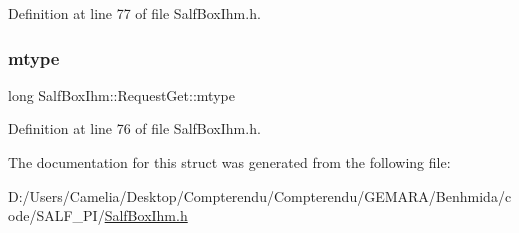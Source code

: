 Definition at line 77 of file Salf\+Box\+Ihm.\+h.

\mbox{\label{struct_salf_box_ihm_1_1_request_get_a4d551291208c5aee03b0e6fb080a0fc5}} 
\subsubsection{\texorpdfstring{mtype}{mtype}}
{\footnotesize\ttfamily long Salf\+Box\+Ihm\+::\+Request\+Get\+::mtype}



Definition at line 76 of file Salf\+Box\+Ihm.\+h.



The documentation for this struct was generated from the following file\+:\begin{DoxyCompactItemize}
\item 
D\+:/\+Users/\+Camelia/\+Desktop/\+Compterendu/\+Compterendu/\+G\+E\+M\+A\+R\+A/\+Benhmida/code/\+S\+A\+L\+F\+\_\+\+P\+I/\hyperlink{_salf_box_ihm_8h}{Salf\+Box\+Ihm.\+h}\end{DoxyCompactItemize}
